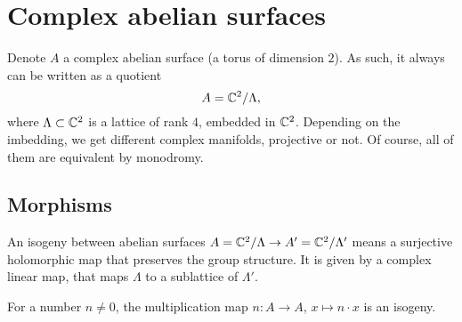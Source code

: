 \section{Complex abelian surfaces}
Denote $A$ a complex abelian surface (a torus of dimension $2$). As such, it always can be written as a quotient
$$
A = \mathbb{C}^2/\Lambda,
$$
where $\Lambda\subset \mathbb{C}^2$ is a lattice of rank $4$, embedded in $\mathbb{C}^2$. 
Depending on the imbedding, we get different complex manifolds, projective or not. Of course, all of them are equivalent by monodromy.
\subsection{Morphisms}
\begin{definition}
An isogeny between abelian surfaces $A=\mathbb{C}^2/\Lambda\rightarrow A'=\mathbb{C}^2/\Lambda'$ means a surjective holomorphic map that preserves the group structure. It is given by a complex linear map, that maps $\Lambda$ to a sublattice of $\Lambda'$. 
\end{definition}
\begin{example}
For a number $n\neq 0$, the multiplication map $n: A\rightarrow A$, $x\mapsto n\cdot x$ is an isogeny.
\end{example}


